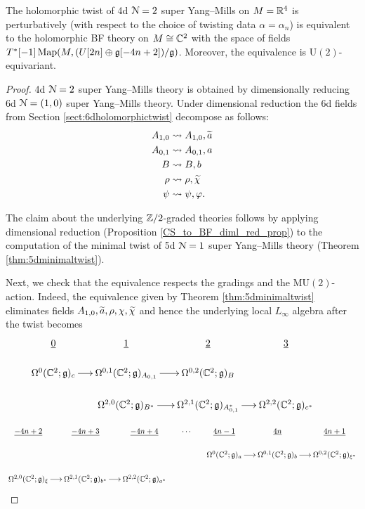 \documentclass[10pt, oneside]{article}
\newcommand{\MU}{\mathrm{MU}}
\renewcommand{\U}{\mathrm{U}}
\begin{document}
\begin{theorem}
The holomorphic twist of 4d $\cN=2$ super Yang--Mills on $M=\RR^4$ is perturbatively (with respect to the choice of twisting data $\alpha = \alpha_n$) is equivalent to the holomorphic BF theory on $M\cong\CC^2$ with the space of fields $T^*[-1] \map(M, (U[2n] \oplus \fg[-4n+2])/\fg)$. 
Moreover, the equivalence is $\U(2)$-equivariant.
\label{thm:4dholomorphictwist}
\end{theorem}
\begin{proof}
4d $\cN=2$ super Yang--Mills theory is obtained by dimensionally reducing 6d $\cN=(1,0)$ super Yang--Mills theory. Under dimensional reduction the 6d fields from Section \ref{sect:6dholomorphictwist} decompose as follows:
\begin{align*}
A_{1, 0}&\rightsquigarrow A_{1, 0}, \Tilde{a} \\
A_{0, 1}&\rightsquigarrow A_{0, 1}, a \\
B&\rightsquigarrow B, b \\
\rho&\rightsquigarrow \rho, \Tilde{\chi} \\
\psi & \rightsquigarrow \psi, \varphi . \\
\end{align*}

The claim about the underlying $\ZZ/2$-graded theories follows by applying dimensional reduction (Proposition \ref{CS_to_BF_diml_red_prop}) to the computation of the minimal twist of 5d $\cN=1$ super Yang--Mills theory (Theorem \ref{thm:5dminimaltwist}).

Next, we check that the equivalence respects  the gradings and the $\MU(2)$-action. 
Indeed, the equivalence given by Theorem \ref{thm:5dminimaltwist} eliminates fields $A_{1, 0}, \Tilde{a}, \rho, \chi, \Tilde{\chi}$ and hence the underlying local $L_\infty$ algebra after the twist becomes
\[
\xymatrix@R=0.5cm@C=0.5cm{
\ul{0} & \ul{1} & \ul{2} & \ul{3} & \\ 
\Omega^0(\CC^2; \gg)_c \ar[r] &\Omega^{0,1}(\CC^2; \gg)_{A_{0,1}} \ar[r] &\Omega^{0,2}(\CC^2; \gg)_{B} \\
  & \Omega^{2,0}(\CC^2 ; \gg)_{B^*} \ar[r] & \Omega^{2,1}(\CC^2 ; \gg)_{A_{0,1}^*} \ar[r] & \Omega^{2,2}(\CC^2 ; \gg)_{c^*} \\
  }
\]

\[
\xymatrix@R=0.5cm@C=0.5cm{
\ul{-4n+2} & \ul{-4n+3} & \ul{-4n+4} & \cdots & \ul{4n-1} & \ul{4n} & \ul{4n+1} \\ 
 &&&& \Omega^0(\CC^2; \gg)_a \ar[r] &\Omega^{0,1}(\CC^2; \gg)_{b} \ar[r] &\Omega^{0,2}(\CC^2; \gg)_{\xi^*} \\
 \Omega^{2,0}(\CC^2; \gg)_\xi \ar[r] &\Omega^{2,1}(\CC^2; \gg)_{b^*} \ar[r] &\Omega^{2,2}(\CC^2; \gg)_{a^*}  \\
}
\]


\end{proof}
\end{document}
